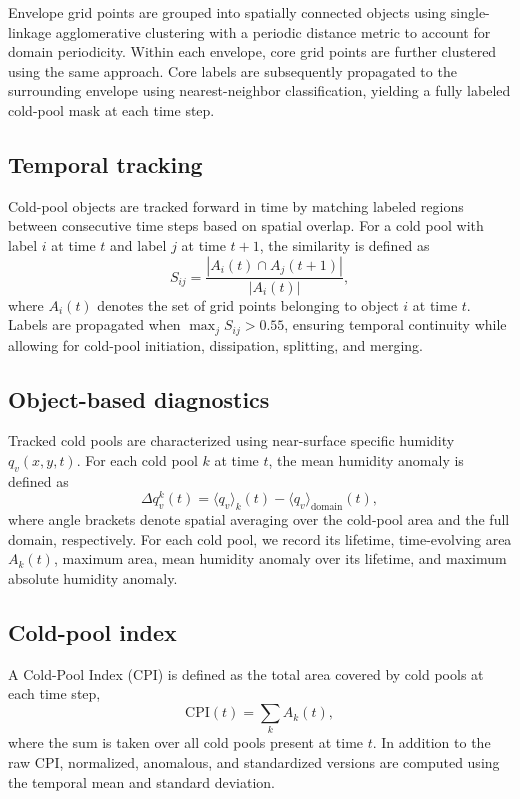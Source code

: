 \documentclass[11pt]{article}
\begin{document}
Envelope grid points are grouped into spatially connected objects using single-linkage agglomerative
clustering with a periodic distance metric to account for domain periodicity. Within each envelope,
core grid points are further clustered using the same approach. Core labels are subsequently propagated
to the surrounding envelope using nearest-neighbor classification, yielding a fully labeled cold-pool
mask at each time step.


\subsection*{Temporal tracking}

Cold-pool objects are tracked forward in time by matching labeled regions between consecutive time
steps based on spatial overlap. For a cold pool with label $i$ at time $t$ and label $j$ at time $t+1$,
the similarity is defined as
\begin{equation}
S_{ij} = \frac{|A_i(t) \cap A_j(t+1)|}{|A_i(t)|},
\end{equation}
where $A_i(t)$ denotes the set of grid points belonging to object $i$ at time $t$. Labels are
propagated when $\max_j S_{ij} > 0.55$, ensuring temporal continuity while allowing for cold-pool
initiation, dissipation, splitting, and merging.

\subsection*{Object-based diagnostics}

Tracked cold pools are characterized using near-surface specific humidity $q_v(x,y,t)$. For each cold
pool $k$ at time $t$, the mean humidity anomaly is defined as
\begin{equation}
\Delta q_v^k(t) = \langle q_v \rangle_k(t) - \langle q_v \rangle_{\mathrm{domain}}(t),
\end{equation}
where angle brackets denote spatial averaging over the cold-pool area and the full domain,
respectively. For each cold pool, we record its lifetime, time-evolving area $A_k(t)$, maximum area,
mean humidity anomaly over its lifetime, and maximum absolute humidity anomaly.

\subsection*{Cold-pool index}

A Cold-Pool Index (CPI) is defined as the total area covered by cold pools at each time step,
\begin{equation}
\mathrm{CPI}(t) = \sum_k A_k(t),
\end{equation}
where the sum is taken over all cold pools present at time $t$. In addition to the raw CPI, normalized,
anomalous, and standardized versions are computed using the temporal mean and standard deviation.
\end{document}
